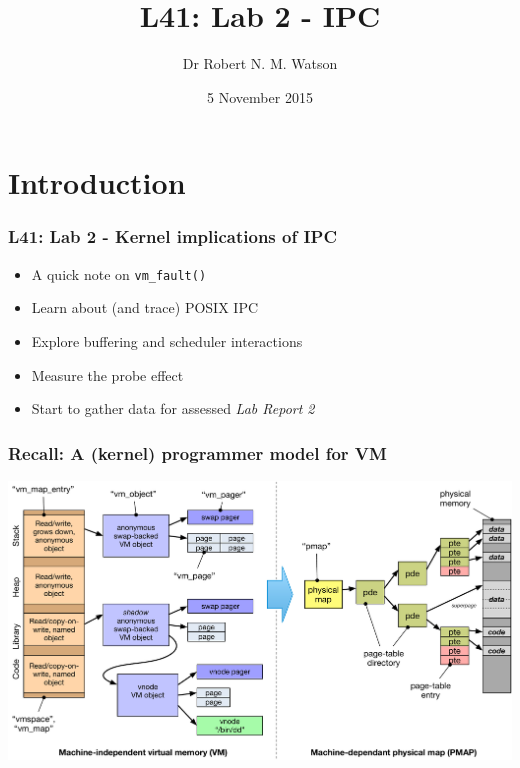 
{
}

\usepackage[english]{babel}
\usepackage[latin1]{inputenc}
\usepackage{graphicx}
\usepackage{times}
\usepackage[T1]{fontenc}
\usepackage{fancyvrb}
\usepackage{hyperref}
\usepackage{listings}


\title{L41: Lab 2 - IPC}
\author{Dr Robert N. M. Watson}
\date{5 November 2015}

\begin{frame}
  \titlepage
\end{frame}

\section{Introduction}

\begin{frame}
  \frametitle{L41: Lab 2 - Kernel implications of IPC}

  \begin{itemize}
    \item A quick note on \texttt{vm\_fault()}
    \item Learn about (and trace) POSIX IPC
    \item Explore buffering and scheduler interactions
    \item Measure the probe effect
    \item Start to gather data for assessed \textit{Lab Report 2}
  \end{itemize}
\end{frame}

\begin{frame}
  \frametitle{Recall: A (kernel) programmer model for VM}

  \includegraphics[width=\textwidth]{../../figures/mach-vm-model.pdf}
\end{frame}


